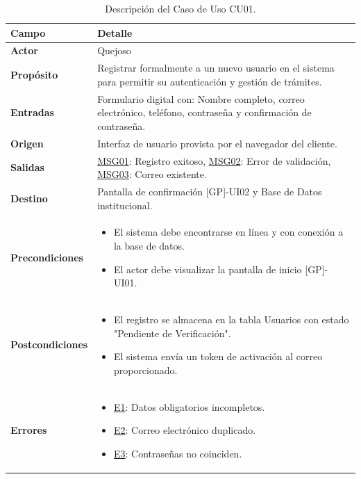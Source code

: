 \begin{appendices}
\begin{table}[htbp]
\centering
\small
\begin{tabular}{|p{3.5cm}|p{10.5cm}|}
\hline
\rowcolor[HTML]{EFEFEF} 
\textbf{Campo} & \textbf{Detalle} \\ \hline
\textbf{Actor} & Quejoso \\ \hline
\textbf{Propósito} & Registrar formalmente a un nuevo usuario en el sistema para permitir su autenticación y gestión de trámites. \\ \hline
\textbf{Entradas} & Formulario digital con: Nombre completo, correo electrónico, teléfono, contraseña y confirmación de contraseña. \\ \hline
\textbf{Origen} & Interfaz de usuario provista por el navegador del cliente. \\ \hline
\textbf{Salidas} & \hyperlink{msg:MSG01}{MSG01}: Registro exitoso, \hyperlink{msg:MSG02}{MSG02}: Error de validación, \hyperlink{msg:MSG03}{MSG03}: Correo existente. \\ \hline
\textbf{Destino} & Pantalla de confirmación [GP]-UI02 y Base de Datos institucional. \\ \hline
\textbf{Precondiciones} & 
\begin{itemize}[nosep, leftmargin=*]
    \item El sistema debe encontrarse en línea y con conexión a la base de datos.
    \item El actor debe visualizar la pantalla de inicio [GP]-UI01.
\end{itemize} \\ \hline
\textbf{Postcondiciones} & 
\begin{itemize}[nosep, leftmargin=*]
    \item El registro se almacena en la tabla Usuarios con estado "Pendiente de Verificación".
    \item El sistema envía un token de activación al correo proporcionado.
\end{itemize} \\ \hline
\textbf{Errores} & 
\begin{itemize}[nosep, leftmargin=*]
    \item \hyperlink{err:E1}{E1}: Datos obligatorios incompletos.
    \item \hyperlink{err:E2}{E2}: Correo electrónico duplicado.
    \item \hyperlink{err:E3}{E3}: Contraseñas no coinciden.
\end{itemize} \\ \hline
\end{tabular}
\caption{Descripción del Caso de Uso CU01.}
\label{tab:cu01_especificacion}
\end{table}


\end{appendices}
